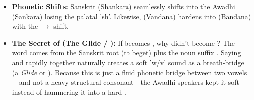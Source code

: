 \begin{tcolorbox}[gotchabox]
\begin{itemize}
    \item \textbf{Phonetic Shifts:} Sanskrit  (Shankara) seamlessly shifts into the Awadhi  (Sankara) losing the palatal 'sh'. Likewise,  (Vandana) hardens into  (Bandana) with the  $\rightarrow$  shift.
    \item \textbf{The Secret of  (The Glide / ):} If  becomes , why didn't  become ? The word  comes from the Sanskrit root  (to beget) plus the noun suffix . Saying  and  rapidly together naturally creates a soft 'w/v' sound as a breath-bridge (a \textit{Glide} or ). Because this  is just a fluid phonetic bridge between two vowels—and not a heavy structural consonant—the Awadhi speakers kept it soft instead of hammering it into a hard .
\end{itemize}
\end{tcolorbox}

\newpage
